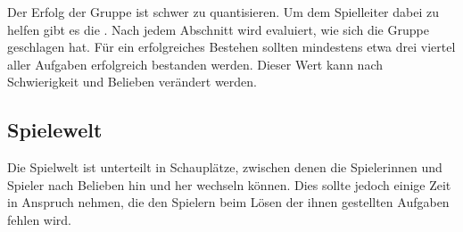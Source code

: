 Der Erfolg der Gruppe ist schwer zu quantisieren. Um dem Spielleiter dabei zu helfen
gibt es die \Moral. Nach jedem Abschnitt wird evaluiert, wie sich die Gruppe 
geschlagen hat. Für ein erfolgreiches Bestehen sollten mindestens etwa drei viertel 
aller Aufgaben erfolgreich bestanden werden. Dieser Wert kann nach Schwierigkeit und
Belieben verändert werden.

\subsection*{Spielewelt}
\label{ssec:world}

Die Spielwelt ist unterteilt in Schauplätze, zwischen denen die Spielerinnen und
Spieler nach Belieben hin und her wechseln können. Dies sollte jedoch einige Zeit in
Anspruch nehmen, die den Spielern beim Lösen der ihnen gestellten Aufgaben fehlen
wird.
